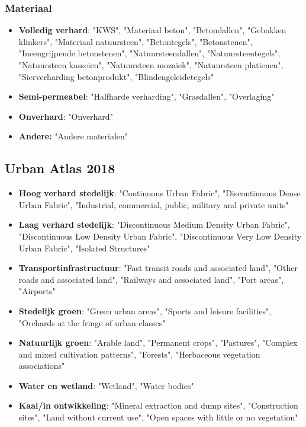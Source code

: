 \documentclass{hogent-article}
\begin{document}
\subsubsection{Materiaal}
\begin{itemize}
    \item \textbf{Volledig verhard}: "KWS", "Materiaal beton", "Betondallen", "Gebakken klinkers", 
        "Materiaal natuursteen", "Betontegels", "Betonstenen", "Ineengrijpende betonstenen", "Natuursteendallen", 
        "Natuursteentegels", "Natuursteen kasseien", "Natuursteen mozaïek", "Natuursteen platienen", 
        "Sierverharding betonprodukt", "Blindengeleidetegels"
    \item \textbf{Semi-permeabel}: "Halfharde verharding", "Grasdallen", "Overlaging"
    \item \textbf{Onverhard}: "Onverhard"
    \item \textbf{Andere:} "Andere materialen"
\end{itemize}

\subsection{Urban Atlas 2018}
\begin{itemize}
    \item \textbf{Hoog verhard stedelijk}: "Continuous Urban Fabric", "Discontinuous Dense Urban Fabric", 
        "Industrial, commercial, public, military and private units"
    \item \textbf{Laag verhard stedelijk}: "Discontinuous Medium Density Urban Fabric", 
        "Discontinuous Low Density Urban Fabric", "Discontinuous Very Low Density Urban Fabric", "Isolated Structures"
    \item \textbf{Transportinfrastructuur}: "Fast transit roads and associated land", "Other roads and associated land", 
        "Railways and associated land", "Port areas", "Airports"
    \item \textbf{Stedelijk groen}: "Green urban areas", "Sports and leisure facilities", "Orchards at the fringe of urban classes"
    \item \textbf{Natuurlijk groen}: "Arable land", "Permanent crops", "Pastures", "Complex and mixed cultivation patterns", 
        "Forests", "Herbaceous vegetation associations"    
    \item \textbf{Water en wetland}: "Wetland", "Water bodies"
    \item \textbf{Kaal/in ontwikkeling}: "Mineral extraction and dump sites", "Construction sites", "Land without current use", 
        "Open spaces with little or no vegetation"
\end{itemize}
\end{document}

